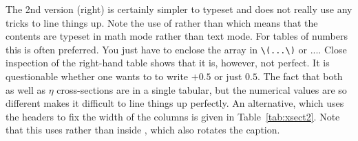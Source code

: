 The 2nd version (right) is certainly simpler to typeset and does not
really use any tricks to line things up. Note the use of 
rather than  which means that the contents are typeset in
math mode rather than text mode. For tables of numbers this is often
preferred. You just have to enclose the array in
\texttt{\textbackslash(...\textbackslash)} or
.... Close inspection of the right-hand
table shows that it is, however, not perfect. It is questionable
whether one wants to to write $+0.5$ or just $0.5$. The fact that both
\pT as well as $\eta$ cross-sections are in a single tabular, but the
numerical values are so different makes it difficult to line things up
perfectly. An alternative, which uses the headers to fix the width of
the columns is given in Table~\ref{tab:xsect2}. Note that this uses
 rather than  inside ,
which also rotates the caption.


